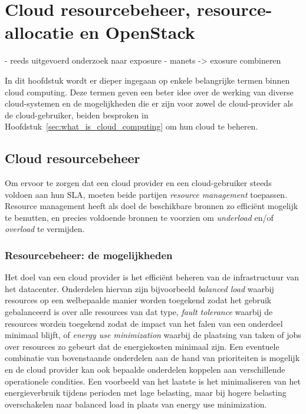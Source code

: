 \chapter{Cloud resourcebeheer, resource-allocatie en OpenStack}

- reeds uitgevoerd onderzoek naar exposure
- manets -> exosure combineren
 
In dit hoofdstuk wordt er dieper ingegaan op enkele belangrijke termen binnen cloud computing. Deze termen geven een beter idee over de werking van diverse cloud-systemen en de mogelijkheden die er zijn voor zowel de cloud-provider als de cloud-gebruiker, beiden besproken in Hoofdstuk~\ref{sec:what_is_cloud_computing} om hun cloud te beheren.

\section{Cloud resourcebeheer}
\label{sec:rmcloud}

Om ervoor te zorgen dat een cloud provider en een cloud-gebruiker steeds voldoen aan hun SLA, moeten beide partijen \textit{resource management} toepassen. Resource management heeft als doel de beschikbare bronnen zo efficiënt mogelijk te benutten, en precies voldoende bronnen te voorzien om \textit{underload} en/of \textit{overload} te vermijden.

\subsection{Resourcebeheer: de mogelijkheden}

Het doel van een cloud provider is het efficiënt beheren van de infrastructuur van het datacenter. Onderdelen hiervan zijn bijvoorbeeld \textit{balanced load} waarbij resources op een welbepaalde manier worden toegekend zodat het gebruik gebalanceerd is over alle resources van dat type, \textit{fault tolerance} waarbij de resources worden toegekend zodat de impact van het falen van een onderdeel minimaal blijft, of \textit{energy use minimization} waarbij de plaatsing van taken of jobs over resources zo gebeurt dat de energiekosten minimaal zijn. Een eventuele combinatie van bovenstaande onderdelen aan de hand van prioriteiten is mogelijk en de cloud provider kan ook bepaalde onderdelen koppelen aan verschillende operationele condities. Een voorbeeld van het laatste is het minimaliseren van het energieverbruik tijdens perioden met lage belasting, maar bij hogere belasting overschakelen naar balanced load in plaats van energy use minimization.

